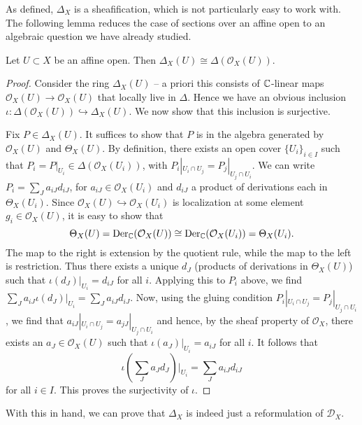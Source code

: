 As defined, $\Delta_X$ is a sheafification,
which is not particularly easy to work with. The following lemma reduces the case of
sections over an affine open to an algebraic question we have already studied.

\begin{lemma}
    Let $U\subset X$ be an affine open. Then $\Delta_X(U) \cong \Delta(\mathcal{O}_X(U)).$
    \label{lem:affine2}
\end{lemma}
\begin{proof}
    Consider the ring $\Delta_X(U)$ -- a priori this consists of $\mathbb{C}$-linear maps
    $\mathcal{O}_X(U)\to\mathcal{O}_X(U)$ that locally live in $\Delta$.
    Hence we have an obvious inclusion $\iota:\Delta(\mathcal{O}_X(U))\hookrightarrow \Delta_X(U)$.
    We now show that this inclusion is surjective.

    Fix $P\in\Delta_X(U)$. It suffices to show that $P$ is in the algebra generated by
    $\mathcal{O}_X(U)$ and $\Theta_X(U)$. By definition, there exists an open cover
    $\{U_i\}_{i\in I}$ such that $P_i=P|_{U_i}\in\Delta(\mathcal{O}_X(U_i))$, with
    $P_i|_{U_i\cap U_j}=P_j|_{U_j\cap U_i}$. We can
    write $P_i=\sum_J a_{iJ}d_{iJ}$, for $a_{iJ}\in\mathcal{O}_X(U_i)$ and $d_{iJ}$ a
    product of derivations each in $\Theta_X(U_i)$. Since
    $\mathcal{O}_X(U)\hookrightarrow \mathcal{O}_X(U_i)$ is localization at some element
    $g_i\in\mathcal{O}_X(U)$, it is easy to show that
    \[\Theta_X(U)=\operatorname{Der}_{\mathbb{C}}(\mathcal{O}_X(U))\cong\operatorname{Der}_{\mathbb{C}}(\mathcal{O}_X(U_i))=\Theta_X(U_i).\]
    The map to the right is extension by the quotient rule, while the map to the left is
    restriction.
    Thus there exists a unique $d_J$ (products of derivations in $\Theta_X(U)$) such
    that $\iota(d_J)|_{U_i}=d_{iJ}$ for all $i$.
    Applying this to $P_i$ above, we find $\sum_J a_{iJ}\iota(d_J)|_{U_i}=\sum_Ja_{iJ}d_{iJ}$.
    Now, using the gluing condition $P_i|_{U_i\cap U_j}=P_j|_{U_j\cap U_i}$,
    we find that $a_{iJ}|_{U_i\cap U_j}=a_{jJ}|_{U_j\cap U_i}$ and hence, by the sheaf
    property of $\mathcal{O}_X$, there exists an $a_J\in\mathcal{O}_X(U)$ such that
    $\iota(a_J)|_{U_i}=a_{iJ}$ for all $i$. It follows that
    \[\iota\left(\sum_Ja_Jd_J\right)\bigg|_{U_i}=\sum_Ja_{iJ}d_{iJ}\]
    for all $i\in I$. This proves the surjectivity of $\iota$.
\end{proof}

With this in hand, we can prove that $\Delta_X$ is indeed just a reformulation of
$\mathscr{D}_X$. 

